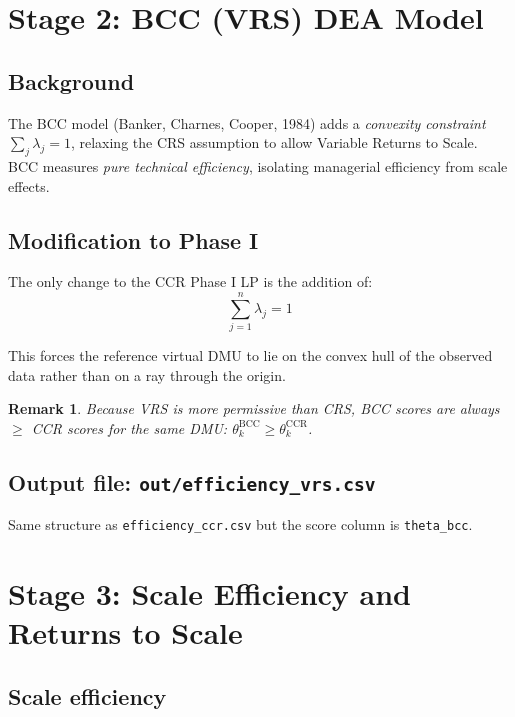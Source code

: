 \documentclass[12pt,a4paper]{article}
\newtheorem{remark}{Remark}
\begin{document}
\section{Stage 2: BCC (VRS) DEA Model}

\subsection{Background}

The BCC model (Banker, Charnes, Cooper, 1984) adds a \emph{convexity constraint}
$\sum_j \lambda_j = 1$, relaxing the CRS assumption to allow Variable Returns to
Scale.  BCC measures \emph{pure technical efficiency}, isolating managerial
efficiency from scale effects.

\subsection{Modification to Phase I}

The only change to the CCR Phase I LP is the addition of:
\[
    \sum_{j=1}^{n} \lambda_j = 1
\]

This forces the reference virtual DMU to lie on the convex hull of the observed
data rather than on a ray through the origin.

\begin{remark}
    Because VRS is more permissive than CRS, BCC scores are always
    $\geq$ CCR scores for the same DMU: $\theta_k^{\text{BCC}} \geq \theta_k^{\text{CCR}}$.
\end{remark}

\subsection{Output file: \texttt{out/efficiency\_vrs.csv}}

Same structure as \texttt{efficiency\_ccr.csv} but the score column is
\texttt{theta\_bcc}.

\section{Stage 3: Scale Efficiency and Returns to Scale}

\subsection{Scale efficiency}
\end{document}
